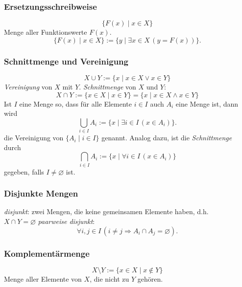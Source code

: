 \subsubsection{Ersetzungsschreibweise}%
\label{ssub:ersetzungsschreibweise}
\begin{minipage}{0.9\linewidth}
\[
\big\{F(x)\mid x\in X \big\}
\]
Menge aller Funktionswerte $F(x)$.
\[
\big\{F(x)\mid x\in X\big\}:=\{y\mid \exists x\in X\,(y=F(x))\}.
\]
\end{minipage}

\subsubsection{Schnittmenge und Vereinigung}%
\label{ssub:schnittmenge_und_vereinigung}
\begin{minipage}{0.9\linewidth}
\[
X\cup Y:=\{x\mid x\in X\lor x\in Y \}
\]
\textit{Vereinigung} von $X$ mit $Y$. \textit{Schnittmenge} von $X$ und $Y$:
\[
X\cap Y:=\{x\in X\mid x\in Y \}=\{x\mid x\in X\land x\in Y\}
\]
Ist $I$ eine Menge so, dass für alle Elemente $i\in I$ auch $A_i$ eine Menge ist, dann wird
\[
\bigcup_{i\in I}A_i:=\{x\mid\exists i\in I\,(x\in A_i) \}.
\]
die Vereinigung von $\{A_i\mid i\in I\}$ genannt.
Analog dazu, ist die \textit{Schnittmenge} durch
\[
\bigcap_{i\in I}A_i:=\{x\mid\forall i\in I\,(x\in A_i) \}
\]
gegeben, falls $I\neq\varnothing$ ist.
\end{minipage}

\subsubsection{Disjunkte Mengen}%
\label{ssub:disjunkte_mengen}
\begin{minipage}{0.9\linewidth}
\textit{disjunkt}: zwei Mengen, die keine gemeinsamen Elemente haben, d.h. \\
$X\cap Y=\varnothing$
\textit{paarweise disjunkt}:
 \[
 \forall i,j\in I\,(i\neq j\Rightarrow A_i\cap A_j=\varnothing).
 \]
\end{minipage}

\subsubsection{Komplementärmenge}%
\label{ssub:komplementärmenge}
\begin{minipage}{0.9\linewidth}
 \[
 X\setminus Y:=\{x\in X\mid x\notin Y\}
 \]
Menge aller Elemente von $X$, die nicht zu $Y$ gehören.
\end{minipage}

